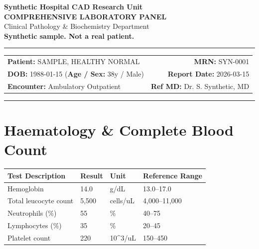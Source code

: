 \documentclass[10pt,a4paper]{article}
\begin{document}
\begin{center}
  {\Large \textbf{Synthetic Hospital CAD Research Unit}}\\
  \vspace{2pt}
  {\normalsize \textbf{COMPREHENSIVE LABORATORY PANEL}}\\
  \vspace{1pt}
  {\footnotesize \textcolor{subtext}{Clinical Pathology \& Biochemistry Department}}\\
  \vspace{4pt}
  {\small \textbf{\textcolor{red!75!black}{Synthetic sample. Not a real patient.}}}\\
  \vspace{3pt}
  \textcolor{linecolor}{\rule{\textwidth}{0.8pt}}
\end{center}

\vspace{2pt}

\noindent
\begin{tabular*}{\textwidth}{@{} l @{\extracolsep{\fill}} r @{}}
  \textbf{Patient:} SAMPLE, HEALTHY NORMAL & \textbf{MRN:} SYN-0001 \\
  \textbf{DOB:} 1988-01-15 \quad (\textbf{Age / Sex:} 38y / Male) & \textbf{Report Date:} 2026-03-15 \\
  \textbf{Encounter:} Ambulatory Outpatient & \textbf{Ref MD:} Dr. S. Synthetic, MD \\
\end{tabular*}

\vspace{2pt}
\noindent\textcolor{linecolor}{\rule{\textwidth}{0.4pt}}
\vspace{6pt}


\section*{Haematology \& Complete Blood Count}

\begin{tabular}{@{} p{6.4cm} p{2.5cm} p{2.5cm} p{3.1cm} @{}}
  \toprule
  \textbf{Test Description} & \textbf{Result} & \textbf{Unit} & \textbf{Reference Range} \\
  \midrule
  Hemoglobin & 14.0 & g/dL & 13.0--17.0 \\
  Total leucocyte count & 5,500 & cells/uL & 4,000--11,000 \\
  Neutrophils (\%) & 55 & \% & 40--75 \\
  Lymphocytes (\%) & 35 & \% & 20--45 \\
  Platelet count & 220 & 10\textasciicircum 3/uL & 150--450 \\
  \bottomrule
\end{tabular}
\end{document}
